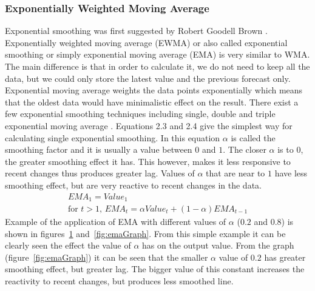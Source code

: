 \subsubsection{Exponentially Weighted Moving Average}
Exponential smoothing was first suggested by Robert Goodell Brown \cite{FOR3980040103}. Exponentially weighted moving average (EWMA) or also called exponential smoothing or simply exponential moving average (EMA) is very similar to WMA. The main difference is that in order to calculate it, we do not need to keep all the data, but we could only store the latest value and the previous forecast only. Exponential moving average weights the data points exponentially which means that the oldest data would have minimalistic effect on the result. There exist a few exponential smoothing techniques including single, double and triple exponential moving average \cite{gardner1985exponential}. Equations 2.3 and 2.4 give the simplest way for calculating single exponential smoothing. In this equation $\alpha$ is called the smoothing factor and it is usually a value between $0$ and $1$. The closer $\alpha$ is to $0$, the greater smoothing effect it has. This however, makes it less responsive to recent changes thus produces greater lag. Values of $\alpha$ that are near to $1$ have less smoothing effect, but are very reactive to recent changes in the data.
\begin{align}\label{ema}
EMA_1 = Value_1 \\
\textrm{for } t > 1\textrm{, }EMA_t = \alpha Value_t + (1-\alpha) EMA_{t-1}
\end{align}
Example of the application of EMA with different values of $\alpha$ ($0.2$ and $0.8$) is shown in figures~\ref{fig:emaTable} and~\ref{fig:emaGraph}. From this simple example it can be clearly seen the effect the value of $\alpha$ has on the output value. From the graph (figure~\ref{fig:emaGraph}) it can be seen that the smaller $\alpha$ value of $0.2$ has greater smoothing effect, but greater lag. The bigger value of this constant increases the reactivity to recent changes, but produces less smoothed line.
\begin{figure}[ht]
	\caption{}
	\label{fig:emaTable}
\end{figure}

